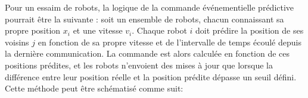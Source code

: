 Pour un essaim de robots, la logique de la commande événementielle prédictive pourrait être la suivante : soit un ensemble de robots, chacun connaissant sa propre position $x_i$ et une vitesse $v_i$. Chaque robot $i$ doit prédire la position de ses voisins $j$ en fonction de sa propre vitesse et de l'intervalle de temps écoulé depuis la dernière communication. La commande est alors calculée en fonction de ces positions prédites, et les robots n'envoient des mises à jour que lorsque la différence entre leur position réelle et la position prédite dépasse un seuil défini.
Cette méthode peut être schématisé comme suit: 
